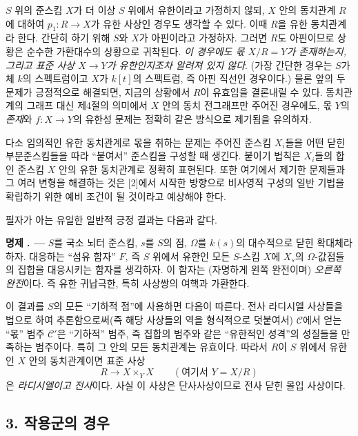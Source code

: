\documentclass[11pt,twoside,openany]{book}
\numberwithin{equation}{section}
\newcommand{\sourceunit}{front}
\newcommand{\src}[1]{%
  \phantomsection\hypertarget{src:\sourceunit:#1}{}%
  \marginpar{\raggedleft\footnotesize\sffamily #1}%
}
\theoremstyle{plain}
\theoremstyle{definition}
\theoremstyle{remark}
\newcommand{\result}[2]{%
  \par\medskip\noindent\textbf{#1%
  \if\relax\detokenize{#2}\relax\else\space#2\fi. ---}\enspace
}
\begin{document}
$S$ 위의 준스킴 $X$가 더 이상 $S$ 위에서 유한이라고 가정하지 않되,
$X$ 안의 동치관계 $R$에 대하여 $p_1:R\longrightarrow X$가 유한
사상인 경우도 생각할 수 있다. 이때 $R$을 유한 동치관계라 한다.
간단히 하기 위해 $S$와 $X$가 아핀이라고 가정하자. 그러면 $R$도
아핀이므로 상황은 순수한 가환대수의 상황으로 귀착된다. \emph{이
경우에도 몫 $X/R=Y$가 존재하는지, 그리고 표준 사상
$X\longrightarrow Y$가 유한인지조차 알려져 있지 않다}. (가장 간단한
경우는 $S$가 체 $k$의 스펙트럼이고 $X$가 $k[t]$의 스펙트럼, 즉 아핀
직선인 경우이다.) 물론 앞의 두 문제가 긍정적으로 해결되면, 지금의
상황에서 $R$이 유효임을 결론내릴 수 있다. 동치관계의 그래프 대신
제4절의 의미에서 $X$ 안의 동치 전그래프만 주어진 경우에도, 몫 $Y$의
\emph{존재}와 $f:X\longrightarrow Y$의 유한성 문제는 정확히 같은
방식으로 제기됨을 유의하자.

다소 임의적인 유한 동치관계로 몫을 취하는 문제는 주어진 준스킴
$X_i$들을 어떤 닫힌 부분준스킴들을 따라 ``붙여서'' 준스킴을 구성할
때 생긴다. 붙이기 법칙은 $X_i$들의 합인 준스킴 $X$ 안의 유한
동치관계로 정확히 표현된다. 또한 여기에서 제기한 문제들과 그 여러
변형을 해결하는 것은 [2]에서 시작한 방향으로 비사영적 구성의 일반
기법을 확립하기 위한 예비 조건이 될 것이라고 예상해야 한다.

필자가 아는 유일한 일반적 긍정 결과는 다음과 같다.

\result{명제}{2.1} $S$를 국소 뇌터 준스킴, $s$를 $S$의 점,
$\Omega$를 $k(s)$의 대수적으로 닫힌 확대체라 하자. 대응하는
\src{104}``섬유 함자'' $F$, 즉 $S$ 위에서 유한인 모든 $S$-스킴
$X$에 $X_s$의 $\Omega$-값점들의 집합을 대응시키는 함자를 생각하자.
이 함자는 (자명하게 왼쪽 완전이며) \emph{오른쪽 완전}이다. 즉 유한
귀납극한, 특히 사상쌍의 여핵과 가환한다.

이 결과를 $S$의 모든 ``기하적 점''에 사용하면 다음이 따른다.
전사 라디시엘 사상들을 법으로 하여 추론함으로써(즉 해당 사상들의
역을 형식적으로 덧붙여서) $\mathcal C$에서 얻는 ``몫'' 범주
$\mathcal C'$은 ``기하적'' 범주, 즉 집합의 범주와 같은 ``유한적인
성격''의 성질들을 만족하는 범주이다. 특히 그 안의 모든 동치관계는
유효이다. 따라서 $R$이 $S$ 위에서 유한인 $X$ 안의 동치관계이면
표준 사상
\[
  R\longrightarrow X\times_Y X\qquad (\text{여기서 }Y=X/R)
\]
은 \emph{라디시엘이고 전사}이다. 사실 이 사상은 단사사상이므로
전사 닫힌 몰입 사상이다.

\subsection*{3. 작용군의 경우}
\end{document}
